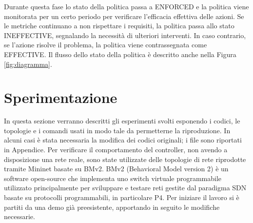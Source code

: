 Durante questa fase lo stato della politica passa a ENFORCED e la politica viene monitorata per un certo periodo per verificare l'efficacia effettiva delle azioni.
Se le metriche continuano a non rispettare i requisiti, la politica passa allo stato INEFFECTIVE, segnalando la necessità di ulteriori interventi.
In caso contrario, se l'azione risolve il problema, la politica viene contrassegnata come EFFECTIVE.
Il flusso dello stato della politica è descritto anche nella Figura \ref{fig:diagramma}.

\section{Sperimentazione}
In questa sezione verranno descritti gli esperimenti svolti esponendo i codici, le topologie e i comandi usati 
in modo tale da permetterne la riproduzione. In alcuni casi è stata necessaria la modifica dei codici originali; i file sono riportati in Appendice.
\newline Per verificare il comportamento del controller, non avendo a disposizione una rete reale, sono state utilizzate delle topologie
di rete riprodotte tramite Mininet basate su BMv2\cite{bmv2}.
BMv2 (Behavioral Model version 2) è un software open-source che implementa uno switch virtuale programmabile utilizzato principalmente
per sviluppare e testare reti gestite dal paradigma SDN basate su protocolli programmabili, in particolare P4.
\newline Per iniziare il lavoro si è partiti da una demo già preesistente, apportando in seguito le modifiche necessarie.
